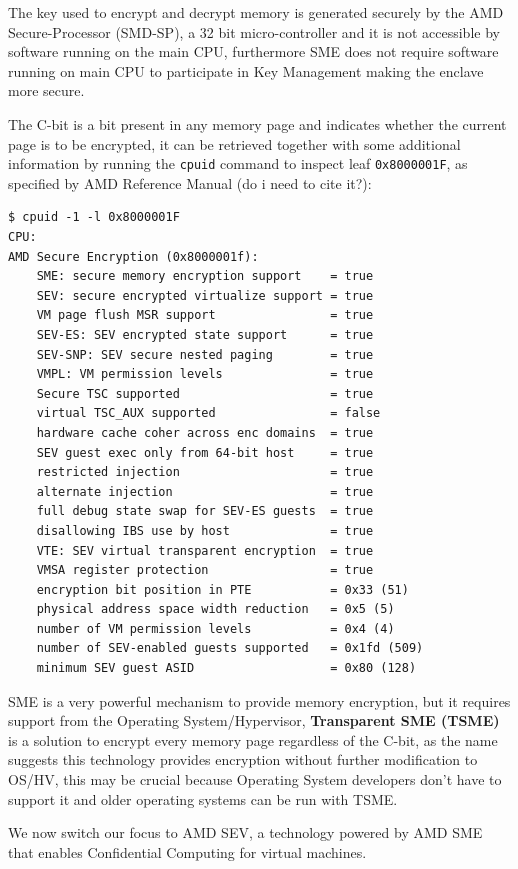 \documentclass[twocolumn]{article}
\begin{document}
    The key used to encrypt and decrypt memory is generated securely by the AMD Secure-Processor (SMD-SP), a 32 bit micro-controller and it is not accessible by software running on the main CPU, furthermore SME does not require software running on main CPU to participate in Key Management making the enclave more secure.

    The C-bit is a bit present in any memory page and indicates whether the current page is to be encrypted, it can be retrieved together with some additional information by running the \texttt{cpuid} command to inspect leaf \texttt{0x8000001F}, as specified by AMD Reference Manual (do i need to cite it?):

    \begin{verbatim}
$ cpuid -1 -l 0x8000001F
CPU:
AMD Secure Encryption (0x8000001f):
    SME: secure memory encryption support    = true
    SEV: secure encrypted virtualize support = true
    VM page flush MSR support                = true
    SEV-ES: SEV encrypted state support      = true
    SEV-SNP: SEV secure nested paging        = true
    VMPL: VM permission levels               = true
    Secure TSC supported                     = true
    virtual TSC_AUX supported                = false
    hardware cache coher across enc domains  = true
    SEV guest exec only from 64-bit host     = true
    restricted injection                     = true
    alternate injection                      = true
    full debug state swap for SEV-ES guests  = true
    disallowing IBS use by host              = true
    VTE: SEV virtual transparent encryption  = true
    VMSA register protection                 = true
    encryption bit position in PTE           = 0x33 (51)
    physical address space width reduction   = 0x5 (5)    
    number of VM permission levels           = 0x4 (4)
    number of SEV-enabled guests supported   = 0x1fd (509)
    minimum SEV guest ASID                   = 0x80 (128)
    \end{verbatim}
    
    SME is a very powerful mechanism to provide memory encryption, but it requires support from the Operating System/Hypervisor, \textbf{Transparent SME (TSME)} is a solution to encrypt every memory page regardless of the C-bit, as the name suggests this technology provides encryption without further modification to OS/HV, this may be crucial because Operating System developers don't have to support it and older operating systems can be run with TSME.

    We now switch our focus to AMD SEV, a technology powered by AMD SME that enables Confidential Computing for virtual machines.
\end{document}
